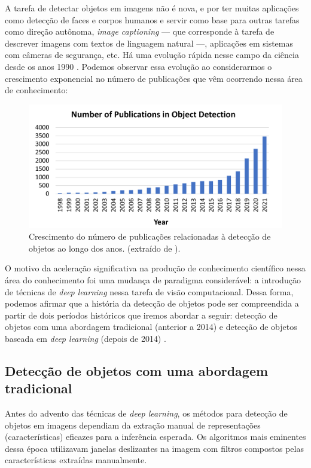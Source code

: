 A tarefa de detectar objetos em imagens não é nova, e por ter muitas aplicações como detecção de faces e corpos humanos e servir como base para outras tarefas como direção autônoma, \emph{image captioning} --- que corresponde à tarefa de descrever imagens com textos de linguagem natural ---, aplicações em sistemas com câmeras de segurança, etc. Há uma evolução rápida nesse campo da ciência desde os anos 1990 \citep{Zou2019Object, Zhao2018Object}. Podemos observar essa evolução ao considerarmos o crescimento exponencial no número de publicações que vêm ocorrendo nessa área de conhecimento:
\begin{figure}[htb!]
    \centering
    \includegraphics[width=0.8\linewidth]{images/obj_detection_evo.png}
    \caption{\label{fig:obj_evo}Crescimento do número de publicações relacionadas à detecção de objetos ao longo dos anos. (extraído de \citep{Zou2019Object}).}
\end{figure}

O motivo da aceleração significativa na produção de conhecimento científico nessa área do conhecimento foi uma mudança de paradigma considerável: a introdução de técnicas de \emph{deep learning} nessa tarefa de visão computacional. Dessa forma, podemos afirmar que a história da detecção de objetos pode ser compreendida a partir de dois períodos históricos que iremos abordar a seguir: detecção de objetos com uma abordagem tradicional (anterior a 2014) e detecção de objetos baseada em \emph{deep learning} (depois de 2014) \citep{Zou2019Object}.

\subsection{Detecção de objetos com uma abordagem tradicional}
Antes do advento das técnicas de \emph{deep learning}, os métodos para detecção de objetos em imagens dependiam da extração manual de representações (características) eficazes para a inferência esperada. Os algoritmos mais eminentes dessa época utilizavam janelas deslizantes na imagem com filtros compostos pelas características extraídas manualmente. 

